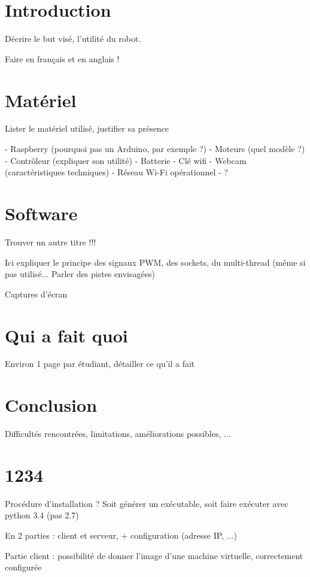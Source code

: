 \documentclass[12pt,a4paper]{report}
\begin{document}
\umonsCoverPage

\tableofcontents

\chapter{Introduction}

Décrire le but visé, l'utilité du robot.

Faire en français et en anglais !

\chapter{Matériel}

Lister le matériel utilisé, justifier sa présence

- Raspberry (pourquoi pas un Arduino, par exemple ?)
- Moteurs (quel modèle ?)
- Contrôleur (expliquer son utilité)
- Batterie
- Clé wifi
- Webcam (caractéristiques techniques)
- Réseau Wi-Fi opérationnel
- ?

\chapter{Software}

Trouver un autre titre !!!

Ici expliquer le principe des signaux PWM, des sockets, du multi-thread (même si pas utilisé... Parler des pistes envisagées)

Captures d'écran

\chapter{Qui a fait quoi}

Environ 1 page par étudiant, détailler ce qu'il a fait

\chapter{Conclusion}

Difficultés rencontrées, limitations, améliorations possibles, ...

\appendix
\chapter{1234}

Procédure d'installation ? Soit générer un exécutable, soit faire exécuter avec python 3.4 (pas 2.7)

En 2 parties : client et serveur, + configuration (adresse IP, ...)

Partie client : possibilité de donner l'image d'une machine virtuelle, correctement configurée
\end{document}
